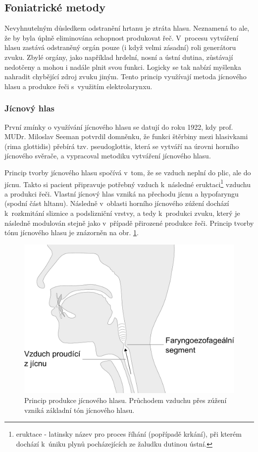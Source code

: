 \subsection{Foniatrické metody} %
\label{chap:cause:treatment:foniatric}

Nevyhnutelným důsledkem odstranění hrtanu je ztráta hlasu. Neznamená to ale, že by byla
úplně eliminována schopnost produkovat řeč. V~procesu vytváření hlasu zastává
odstraněný orgán pouze (i když velmi zásadní) roli generátoru zvuku. Zbylé
orgány, jako například hrdelní, nosní a ústní dutina, zůstávají nedotčeny a mohou i
nadále plnit svou funkci. Logicky se tak nabízí myšlenka nahradit chybějící
zdroj zvuku jiným. Tento princip využívají metoda jícnového hlasu a produkce řeči s~využitím
elektrolarynxu.

\subsubsection{Jícnový hlas} %
\label{chap:cause:treatment:foniatric:esophageal}

První zmínky o využívání jícnového hlasu se datují do roku 1922, kdy prof. MUDr. Miloslav Seeman
\cite{seeman1922speech} potvrdil domněnku, že funkci štěrbiny mezi hlasivkami (rima
glottidis) přebírá tzv. pseudoglottis, která se vytváří na úrovni horního
jícnového svěrače, a vypracoval metodiku vytváření jícnového
hlasu.

Princip tvorby jícnového hlasu spočívá v~tom, že se vzduch neplní do plic, ale do jícnu.
Takto si pacient připravuje potřebný vzduch  k~následné
eruktaci\footnote{eruktace - latinsky název pro proces říhání (popřípadě
krkání), při kterém dochází  k~úniku plynů pocházejících ze žaludku dutinou
ústní.} vzduchu a produkci řeči. Vlastní jícnový hlas vzniká na přechodu
jícnu a hypofaryngu (spodní část hltanu). Následně v~oblasti horního jícnového
zúžení dochází  k~rozkmitání sliznice a podslizniční vrstvy, a tedy  k~produkci zvuku,
který je následně modulován stejně jako v~případě přirozené produkce řeči.
Princip tvorby  tónu jícnového hlasu je znázorněn na obr.
\ref{fig:cause:treatment:esophageal}.

\begin{figure}[htb]
  \begin{center}
    \includegraphics[width=0.6\linewidth]{ch3-cause/figures/esophageal}
    \caption[Princip produkce jícnového hlasu.]{Princip produkce jícnového hlasu. Průchodem vzduchu přes zúžení vzniká základní tón jícnového hlasu.}
    \label{fig:cause:treatment:esophageal}
  \end{center}
\end{figure}

